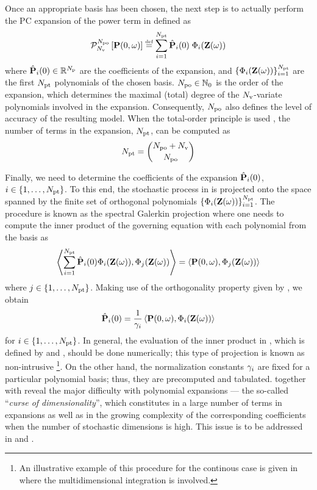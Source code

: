 Once an appropriate basis has been chosen, the next step is to actually perform the PC expansion of the power term in  defined as
\begin{equation} \elabel{pc-expansion}
  \oPC{\vars}{\pcorder}{\vP(0, \o)} \eqdef \sum_{i = 1}^{\pcterms} \pcc{\vP}_i(0) \; \pcb_i(\vZ(\o))
\end{equation}
where $\hat{\mathbf{P}}_i(0) \in \mathbb{R}^{N_\text{p}}$ are the coefficients of the expansion, and $\{ \Phi_i(\mathbf{Z}(\omega)) \}_{i = 1}^{{N_\text{pt}}}$ are the first ${N_\text{pt}}$ polynomials of the chosen basis. ${N_\text{po}} \in \mathbb{N}_{0}$ is the order of the expansion, which determines the maximal (total) degree of the ${N_\text{v}}$-variate polynomials involved in the expansion. Consequently, ${N_\text{po}}$ also defines the level of accuracy of the resulting model. When the total-order principle is used \cite{eldred2009}, the number of terms in the expansion, ${N_\text{pt}}$, can be computed as
\begin{equation} \elabel{pc-terms}
  \pcterms = {\pcorder + \vars \choose \pcorder}
\end{equation}

Finally, we need to determine the coefficients of the expansion $\hat{\mathbf{P}}_i(0)$, $i \in \{ 1, \dotsc, {N_\text{pt}} \}$. To this end, the stochastic process in  is projected onto the space spanned by the finite set of orthogonal polynomials $\{ \Phi_i(\mathbf{Z}(\omega)) \}_{i = 1}^{{N_\text{pt}}}$. The procedure is known as the spectral Galerkin projection where one needs to compute the inner product of the governing equation  with each polynomial from the basis as
\[
  \oInner{\sum_{i=1}^{\pcterms} \pcc{\vP}_i(0) \pcb_i(\vZ(\o))}{\pcb_j(\vZ(\o))} = \oInner{\vP(0, \o)}{\pcb_j(\vZ(\o))}
\]
where $j \in \{ 1, \dotsc, {N_\text{pt}} \}$. Making use of the orthogonality property given by , we obtain
\begin{equation} \elabel{pc-coefficients}
  \pcc{\vP}_i(0) = \frac{1}{\pcn_i} \oInner{\vP(0, \o)}{\pcb_i(\vZ(\o))}
\end{equation}
for $i \in \{ 1, \dotsc, {N_\text{pt}} \}$. In general, the evaluation of the inner product in , which is defined by  and , should be done numerically; this type of projection is known as non-intrusive \footnote{An illustrative example of this procedure for the continous case is given in  where the multidimensional integration is involved.}. On the other hand, the normalization constants $\gamma_i$ are fixed for a particular polynomial basis; thus, they are precomputed and tabulated.  together with  reveal the major difficulty with polynomial expansions --- the so-called ``\emph{curse of dimensionality}'', which constitutes in a large number of terms in expansions as well as in the growing complexity of the corresponding coefficients when the number of stochastic dimensions is high. This issue is to be addressed in  and .

